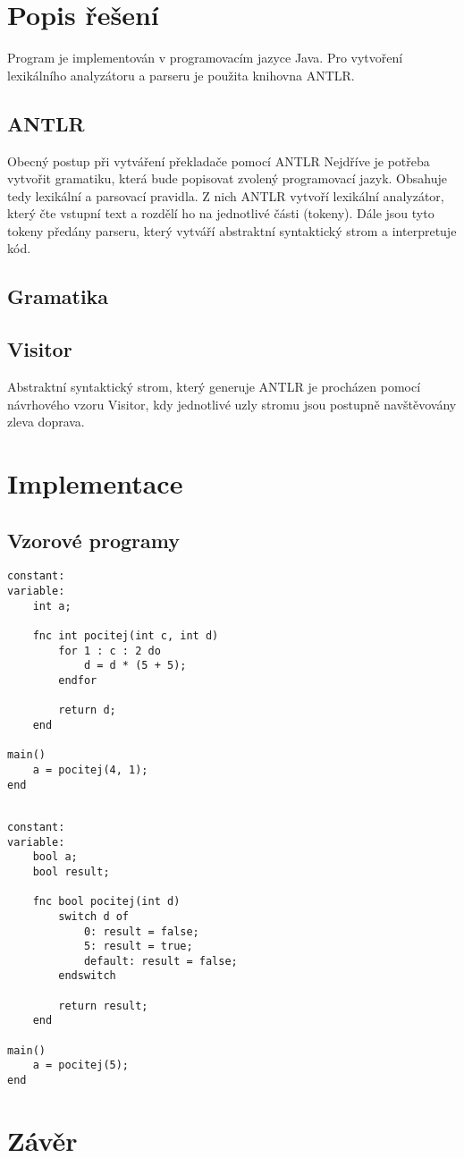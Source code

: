 \documentclass{style}
\begin{document}
\chapter{Popis řešení}
Program je implementován v programovacím jazyce Java. Pro vytvoření lexikálního analyzátoru a parseru je použita knihovna ANTLR.

\section{ANTLR}
Obecný postup při vytváření překladače pomocí ANTLR
Nejdříve je potřeba vytvořit gramatiku, která bude popisovat zvolený programovací jazyk. Obsahuje tedy lexikální a parsovací pravidla. Z nich ANTLR vytvoří lexikální analyzátor, který čte vstupní text a rozdělí ho na jednotlivé části (tokeny). Dále jsou tyto tokeny předány parseru, který vytváří abstraktní syntaktický strom a interpretuje kód.

\section{Gramatika}

\section{Visitor}
Abstraktní syntaktický strom, který generuje ANTLR je procházen pomocí návrhového vzoru Visitor, kdy jednotlivé uzly stromu jsou postupně navštěvovány zleva doprava.

\chapter{Implementace}



\section{Vzorové programy}
\begin{lstlisting}[frame=single]  % Start your code-block
constant:
variable:
    int a;

    fnc int pocitej(int c, int d)
        for 1 : c : 2 do
            d = d * (5 + 5);
        endfor

        return d;
    end

main()
    a = pocitej(4, 1);
end
\end{lstlisting}

\begin{lstlisting}[frame=single]  % Start your code-block

constant:
variable:
    bool a;
    bool result;

    fnc bool pocitej(int d)
        switch d of
            0: result = false;
            5: result = true;
            default: result = false;
        endswitch

        return result;
    end

main()
    a = pocitej(5);
end
\end{lstlisting}

\chapter{Závěr}
\end{document}

